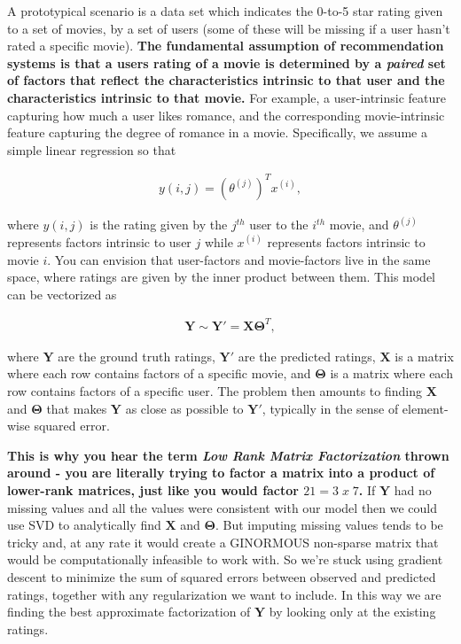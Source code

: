 \documentclass[11pt]{article}
\begin{document}
A prototypical scenario is a data set which indicates the 0-to-5 star
rating given to a set of movies, by a set of users (some of these will
be missing if a user hasn't rated a specific movie). \textbf{The
fundamental assumption of recommendation systems is that a users rating
of a movie is determined by a \emph{paired} set of factors that reflect
the characteristics intrinsic to that user and the characteristics
intrinsic to that movie.} For example, a user-intrinsic feature
capturing how much a user likes romance, and the corresponding
movie-intrinsic feature capturing the degree of romance in a movie.
Specifically, we assume a simple linear regression so that

\begin{align*}
y(i, j) = (\theta^{(j)})^Tx^{(i)},
\end{align*}

where \(y(i, j)\) is the rating given by the \(j^{th}\) user to the
\(i^{th}\) movie, and \(\theta^{(j)}\) represents factors intrinsic to
user \(j\) while \(x^{(i)}\) represents factors intrinsic to movie
\(i\). You can envision that user-factors and movie-factors live in the
same space, where ratings are given by the inner product between them.
This model can be vectorized as

\begin{align*}
\mathbf{Y} \sim \mathbf{Y}' = \mathbf{X}\mathbf{\Theta}^T,
\end{align*}

where \(\mathbf{Y}\) are the ground truth ratings, \(\mathbf{Y}'\) are
the predicted ratings, \(\mathbf{X}\) is a matrix where each row
contains factors of a specific movie, and \(\mathbf{\Theta}\) is a
matrix where each row contains factors of a specific user. The problem
then amounts to finding \(\mathbf{X}\) and \(\mathbf{\Theta}\) that
makes \(\mathbf{Y}\) as close as possible to \(\mathbf{Y'}\), typically
in the sense of element-wise squared error.

\textbf{This is why you hear the term \emph{Low Rank Matrix
Factorization} thrown around - you are literally trying to factor a
matrix into a product of lower-rank matrices, just like you would factor
\(21 = 3\;x\;7\).} If \(\mathbf{Y}\) had no missing values and all the
values were consistent with our model then we could use SVD to
analytically find \(\mathbf{X}\) and \(\mathbf{\Theta}\). But imputing
missing values tends to be tricky and, at any rate it would create a
GINORMOUS non-sparse matrix that would be computationally infeasible to
work with. So we're stuck using gradient descent to minimize the sum of
squared errors between observed and predicted ratings, together with any
regularization we want to include. In this way we are finding the best
approximate factorization of \(\mathbf{Y}\) by looking only at the
existing ratings.
\end{document}
